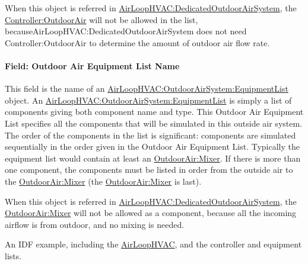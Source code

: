 When this object is referred in \hyperref[airloophvacdedicatedoutdoorairsystem]{AirLoopHVAC:DedicatedOutdoorAirSystem}, the \hyperref[controlleroutdoorair]{Controller:OutdoorAir} will not be allowed in the list, becauseAirLoopHVAC:DedicatedOutdoorAirSystem does not need Controller:OutdoorAir to determine the amount of outdoor air flow rate.

\paragraph{Field: Outdoor Air Equipment List Name}\label{field-outdoor-air-equipment-list-name}

This field is the name of an \hyperref[airloophvacoutdoorairsystemequipmentlist]{AirLoopHVAC:OutdoorAirSystem:EquipmentList} object. An \hyperref[airloophvacoutdoorairsystemequipmentlist]{AirLoopHVAC:OutdoorAirSystem:EquipmentList} is simply a list of components giving both component name and type. This Outdoor Air Equipment List specifies all the components that will be simulated in this outside air system. The order of the components in the list is significant: components are simulated sequentially in the order given in the Outdoor Air Equipment List. Typically the equipment list would contain at least an \hyperref[outdoorairmixer]{OutdoorAir:Mixer}. If there is more than one component, the components must be listed in order from the outside air to the \hyperref[outdoorairmixer]{OutdoorAir:Mixer} (the \hyperref[outdoorairmixer]{OutdoorAir:Mixer} is last).

When this object is referred in \hyperref[airloophvacdedicatedoutdoorairsystem]{AirLoopHVAC:DedicatedOutdoorAirSystem}, the \hyperref[outdoorairmixer]{OutdoorAir:Mixer} will not be allowed as a component, because all the incoming airflow is from outdoor, and no mixing is needed.

An IDF example, including the \hyperref[airloophvac]{AirLoopHVAC}, and the controller and equipment lists.

